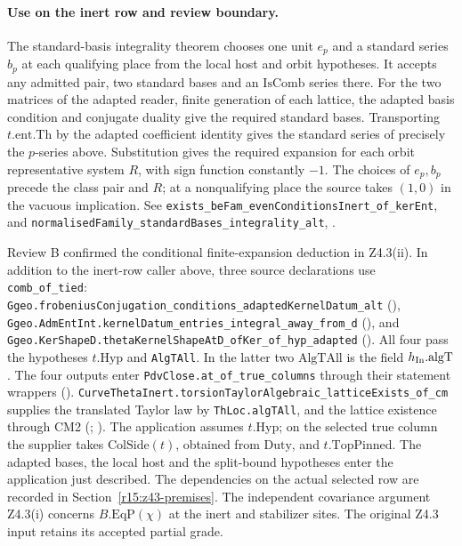 \paragraph{Use on the inert row and review boundary.}
The standard-basis integrality theorem chooses one unit $e_p$ and a
standard series $b_p$ at each qualifying place from the local host and
orbit hypotheses. It accepts any admitted pair, two standard bases and
an $\mathrm{IsComb}$ series there. For the two matrices of the adapted
reader, finite generation of each lattice, the adapted basis condition
and conjugate duality give the required standard bases. Transporting
$t.\mathrm{ent}.\mathrm{Th}$ by the adapted coefficient identity gives
the standard series of precisely the $p$-series above. Substitution gives
the required expansion for each orbit representative system $R$, with
sign function constantly $-1$. The choices of $e_p,b_p$ precede the class
pair and $R$; at a nonqualifying place the source takes $(1,0)$ in the
vacuous implication. See \nolinkurl{exists_beFam_evenConditionsInert_of_kerEnt},
and \nolinkurl{normalisedFamily_standardBases_integrality_alt},
.

Review B confirmed the conditional finite-expansion deduction in
Z4.3(ii). In addition to the inert-row caller above, three source
declarations use \nolinkurl{comb_of_tied}:
\nolinkurl{Ggeo.frobeniusConjugation_conditions_adaptedKernelDatum_alt}
(),
\nolinkurl{Ggeo.AdmEntInt.kernelDatum_entries_integral_away_from_d}
(), and
\nolinkurl{Ggeo.KerShapeD.thetaKernelShapeAtD_ofKer_of_hyp_adapted}
().
All four pass the hypotheses $t.\mathrm{Hyp}$ and \nolinkurl{AlgTAll}.
In the latter two $\mathrm{AlgTAll}$ is the field $h_{\rm In}.\mathrm{algT}$.
The four outputs enter \nolinkurl{PdvClose.at_of_true_columns} through
their statement wrappers ().
\nolinkurl{CurveThetaInert.torsionTaylorAlgebraic_latticeExists_of_cm}
supplies the translated Taylor law by \nolinkurl{ThLoc.algTAll},
and the lattice existence through CM2
(;
).
The application assumes $t.\mathrm{Hyp}$; on the selected
true column the supplier takes $\mathrm{ColSide}(t)$, obtained from
$\mathrm{Duty}$, and $t.\mathrm{TopPinned}$. The adapted bases, the
local host and the split-bound hypotheses enter the application just
described. The dependencies on the actual selected row are recorded in
Section~\ref{r15:z43-premises}. The independent covariance argument
Z4.3(i) concerns $B.\mathrm{EqP}(\chi)$ at the inert and stabilizer
sites. The original Z4.3 input retains its accepted partial grade.

